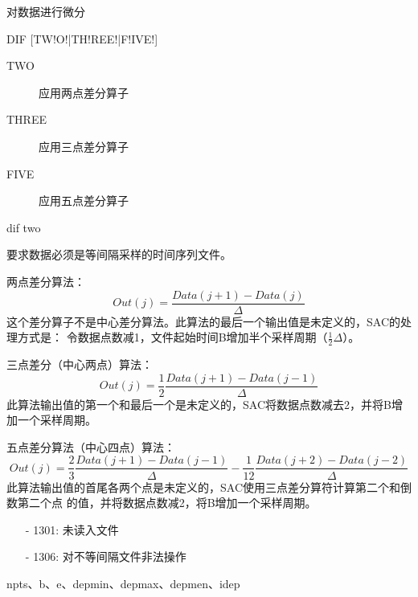 \label{cmd:dif}

对数据进行微分

\begin{SACSTX}
DIF [TW!O!|TH!REE!|F!IVE!]
\end{SACSTX}

\begin{description}
\item [TWO]   应用两点差分算子
\item [THREE] 应用三点差分算子
\item [FIVE]  应用五点差分算子
\end{description}

\begin{SACDFT}
dif two
\end{SACDFT}

要求数据必须是等间隔采样的时间序列文件。

两点差分算法：
\[ Out(j) =\frac{Data(j+1) - Data(j)}{\Delta} \]
这个差分算子不是中心差分算法。此算法的最后一个输出值是未定义的，SAC的处理方式是：
令数据点数减1，文件起始时间B增加半个采样周期（$\frac{1}{2}\Delta$）。

三点差分（中心两点）算法：
\[ Out(j) = \frac{1}{2} \frac{Data(j+1) - Data(j-1)}{\Delta} \]
此算法输出值的第一个和最后一个是未定义的，SAC将数据点数减去2，并将B增加一个采样周期。

五点差分算法（中心四点）算法：
\[ Out(j) = \frac{2}{3} \frac{Data(j+1) - Data(j-1)}{\Delta} - \frac{1}{12} \frac{Data(j+2) - Data(j-2)}{\Delta} \]
此算法输出值的首尾各两个点是未定义的，SAC使用三点差分算符计算第二个和倒数第二个点
的值，并将数据点数减2，将B增加一个采样周期。

\begin{itemize}
\item[-]1301: 未读入文件
\item[-]1306: 对不等间隔文件非法操作
\end{itemize}

npts、b、e、depmin、depmax、depmen、idep
